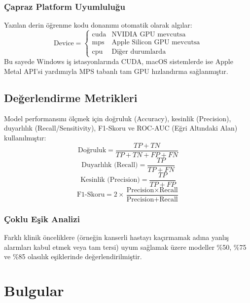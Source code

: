 \documentclass[12pt,a4paper]{article}
\begin{document}
\subsubsection{Çapraz Platform Uyumluluğu}
Yazılan derin öğrenme kodu donanımı otomatik olarak algılar:
\begin{equation}
    \text{Device} = \begin{cases} 
      \text{cuda} & \text{NVIDIA GPU mevcutsa} \\
      \text{mps} & \text{Apple Silicon GPU mevcutsa} \\
      \text{cpu} & \text{Diğer durumlarda}
   \end{cases}
\end{equation}
Bu sayede Windows iş istasyonlarında CUDA, macOS sistemlerde ise Apple Metal API'si yardımıyla MPS tabanlı tam GPU hızlandırma sağlanmıştır.

\subsection{Değerlendirme Metrikleri}
Model performansını ölçmek için doğruluk (Accuracy), kesinlik (Precision), duyarlılık (Recall/Sensitivity), F1-Skoru ve ROC-AUC (Eğri Altındaki Alan) kullanılmıştır:
\begin{equation}
    \text{Doğruluk} = \frac{TP + TN}{TP + TN + FP + FN}
\end{equation}
\begin{equation}
    \text{Duyarlılık (Recall)} = \frac{TP}{TP + FN}
\end{equation}
\begin{equation}
    \text{Kesinlik (Precision)} = \frac{TP}{TP + FP}
\end{equation}
\begin{equation}
    \text{F1-Skoru} = 2 \times \frac{\text{Precision} \times \text{Recall}}{\text{Precision} + \text{Recall}}
\end{equation}

\subsubsection{Çoklu Eşik Analizi}
Farklı klinik önceliklere (örneğin kanserli hastayı kaçırmamak adına yanlış alarmları kabul etmek veya tam tersi) uyum sağlamak üzere modeller \%50, \%75 ve \%85 olasılık eşiklerinde değerlendirilmiştir.

\section{Bulgular}
\label{sec:bulgular}
\end{document}
